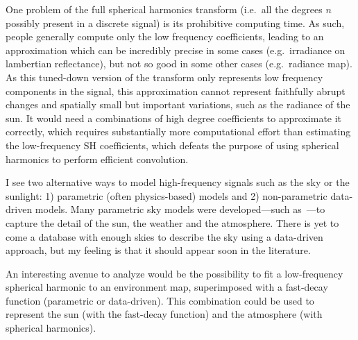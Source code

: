 \documentclass{report}
\begin{document}
One problem of the full spherical harmonics transform (i.e.\ all the degrees $n$ possibly present in a discrete signal) is its prohibitive computing time. As such, people generally compute only the low frequency coefficients, leading to an approximation which can be incredibly precise in some cases (e.g.\ irradiance on lambertian reflectance), but not so good in some other cases (e.g.\ radiance map). As this tuned-down version of the transform only represents low frequency components in the signal, this approximation cannot represent faithfully abrupt changes and spatially small but important variations, such as the radiance of the sun. It would need a combinations of high degree coefficients to approximate it correctly, which requires substantially more computational effort than estimating the low-frequency SH coefficients, which defeats the purpose of using spherical harmonics to perform efficient convolution.

I see two alternative ways to model high-frequency signals such as the sky or the sunlight: 1) parametric (often physics-based) models and 2) non-parametric data-driven models. Many parametric sky models were developed---such as~\cite{preetham-siggraph-99,perez-se-93}---to capture the detail of the sun, the weather and the atmosphere. There is yet to come a database with enough skies to describe the sky using a data-driven approach, but my feeling is that it should appear soon in the literature.

An interesting avenue to analyze would be the possibility to fit a low-frequency spherical harmonic to an environment map, superimposed with a fast-decay function (parametric or data-driven). This combination could be used to represent the sun (with the fast-decay function) and the atmosphere (with spherical harmonics).


{\small


}
\end{document}

